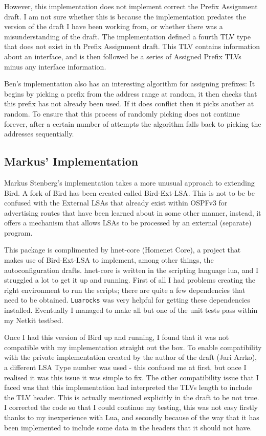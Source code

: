 \documentclass[12pt]{report}
\begin{document}
However, this implementation does not implement correct the Prefix Assignment
draft. I am not sure whether this is because the implementation predates the
version of the draft I have been working from, or whether there was a
misunderstanding of the draft. The implementation defined a fourth TLV type
that does not exist in th Prefix Assignment draft. This TLV contains information
about an interface, and is then followed be a series of Assigned Prefix TLVs
minus any interface information. 

Ben's implementation also has an interesting algorithm for assigning prefixes:
It begins by picking a prefix from the address range at random, it then checks
that this prefix has not already been used. If it does conflict then it picks
another at random. To ensure that this process of randomly picking does not
continue forever, after a certain number of attempts the algorithm falls back
to picking the addresses sequentially. 

\subsection{Markus' Implementation}
Markus Stenberg's implementation takes a more unusual approach to extending
Bird. A fork of Bird has been created called Bird-Ext-LSA\@. This is not to be
be confused with the External LSAs that already exist within OSPFv3 for
advertising routes that have been learned about in some other manner, instead,
it offers a mechanism that allows LSAs to be processed by an external
(separate) program. 

This package is complimented by hnet-core (Homenet Core), a project that makes
use of Bird-Ext-LSA to implement, among other things, the autoconfiguration
drafts\@. hnet-core is written in the scripting language lua, and I struggled a
lot to get it up and running. First of all I had problems creating the right
environment to run the scripts; there are quite a few dependencies that need to
be obtained. \texttt{Luarocks} was very helpful for getting these dependencies
installed. Eventually I managed to make all but one of the unit tests pass
within my Netkit testbed.

Once I had this version of Bird up and running, I found that it was not
compatible with my implementation straight out the box. To enable compatibility
with the private implementation created by the author of the draft (Jari Arrko),
a different LSA Type number was used - this confused me at first, but once I
realised it was this issue it was simple to fix. The other compatibility issue
that I faced was that this implementation had interpreted the TLVs length to
include the TLV header. This is actually mentioned explicitly in the draft to
be not true. I corrected the code so that I could continue my testing, this was
not easy firstly thanks to my inexperience with Lua, and secondly because of
the way that it has been implemented to include some data in the headers that
it should not have.  
\end{document}
